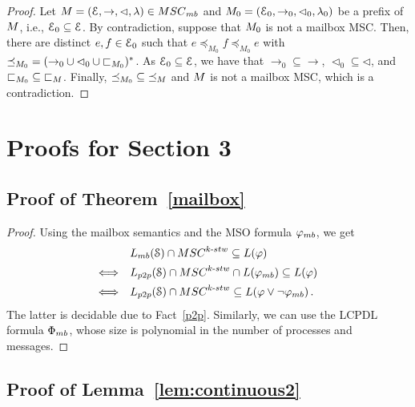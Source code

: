 \documentclass[a4paper,UKenglish,cleveref, autoref, thm-restate]{lipics-v2021}
\begin{document}
\prefixmailbox*

\begin{proof}
	Let $\msc = (\Events, \procrel, \lhd, \lambda) \in \mbMSCs$ and $M_0 =
	(\mathcal{E}_0, \to_0, \lhd_0, \lambda_0)$ be a prefix of $M$, i.e.,
	$\mathcal{E}_0 \subseteq \mathcal{E}$. By contradiction, suppose that $M_0$ is not a
	mailbox MSC. Then, there are distinct $e,f \in \mathcal{E}_0$ such that $e \preceq_{M_0} f \preceq_{M_0}
	e$ with ${\preceq_{M_0}} = ({\rightarrow_0} \cup {\lhd_0} \cup {\sqsubset_{M_0}})^*$.
	As $\mathcal{E}_0 \subseteq \mathcal{E}$, we have that ${\rightarrow_0} \subseteq {\rightarrow}$, ${\lhd_0} \subseteq {\lhd}$, and ${\sqsubset_{M_0}} \subseteq {\sqsubset_{M}}$. Finally, ${\preceq_{M_0}} \subseteq {\preceq_{M}}$ and $M$ is not a mailbox MSC, which is a contradiction.
\end{proof}






\section{Proofs for Section 3}

\subsection{Proof of Theorem~\ref{mailbox}}
\label{app:mailbox}

\boundedmc*

\begin{proof}
Using the mailbox semantics and the MSO formula $\mbformula$, we get
\[\begin{array}{rl}
 &\mbL{\System} \cap \stwMSCs{k} \subseteq L(\phi)\\[1ex]
 \Longleftrightarrow &\ppL{\System} \cap \stwMSCs{k}\cap L(\mbformula)  \subseteq L(\phi)\\[1ex]
 \Longleftrightarrow &\ppL{\System} \cap \stwMSCs{k} \subseteq L(\phi \vee \neg \mbformula)\,.
\end{array}\]
The latter is decidable due to Fact~\ref{p2p}.
Similarly, we can use the LCPDL formula $\mbFormula$, whose size is polynomial in the number of processes and messages.
\end{proof}



\subsection{Proof of Lemma~\ref{lem:continuous2}}
\label{app:continuous2}
\end{document}
